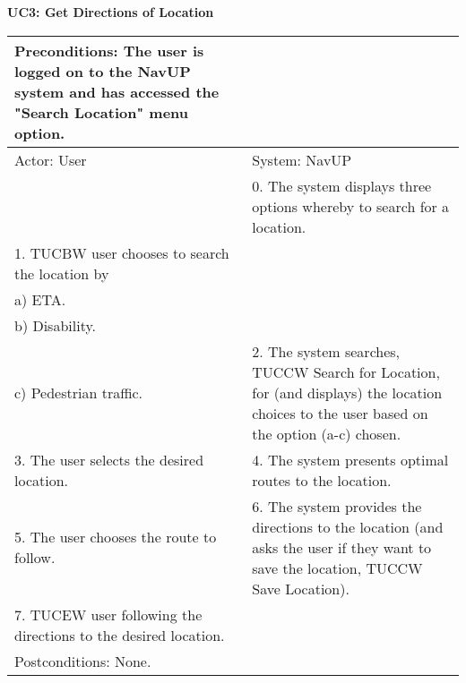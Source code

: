 \documentclass{article}
\begin{document}
		
        		\centering
					\textbf{UC3: Get Directions of Location}\\
       		 \small
       		 \begin{tabular}{|p{8cm}|p{8cm}|}
       		 \hline
       		 Preconditions: The user is logged on to the NavUP system and has accessed the "Search Location" menu option.& \\
       		 \hline
       		 Actor: User & System: NavUP \\
        		\hline
       		 & 0.	The system displays three options whereby to search for a location.\\
       		 \hline
       		 1.	TUCBW user chooses to search the location by 

						\\a)	ETA.
						\\b)	Disability.
						\\c)	Pedestrian traffic.
 & 2.	The system searches, TUCCW Search for Location, for (and displays) the location choices to the user based on the option (a-c) chosen. \\
        		\hline
       		 3.	The user selects the desired location. & 4.	The system presents optimal routes to the location. \\
        		\hline
       		 5.	The user chooses the route to follow. & 6.	The system provides the directions to the location (and asks the user if they want to save the location, TUCCW Save Location).\\
        		\hline
        		7.	TUCEW user following the directions to the desired location. & \\
       		 \hline
        		Postconditions: None.& \\
        		\hline
        \end{tabular} 
        
\end{document}

